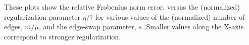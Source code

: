 \documentclass[xcolor=dvipsnames]{beamer}
\begin{document}
\begin{frame}
\begin{figure}[h]
{  }
\setcounter{subfigure}{0}
\vspace{-1.5em}
\end{figure}
These plots show the relative Frobenius norm error, versus the (normalized) regularization parameter 
$\eta / \bar \tau$ for various values of the (normalized) number of edges, 
$m/\mu$, and the edge-swap parameter, $s$.
Smaller values along the X-axis correspond to stronger regularization.
\end{frame}
\end{document}
